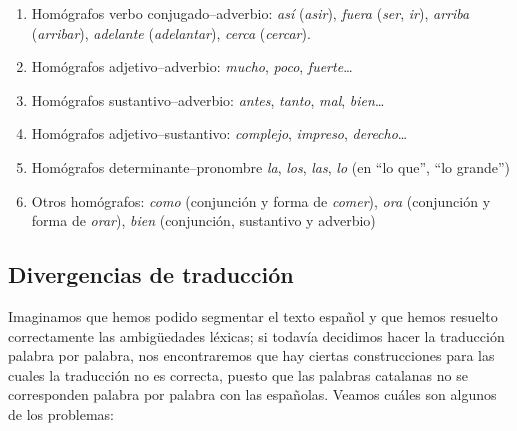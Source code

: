 {\begin{enumerate}
\item Homógrafos verbo conjugado--adverbio: \emph{así} (\emph{asir}), \emph{fuera} (\emph{ser}, \emph{ir}), \emph{ arriba} (\emph{arribar}), {\em adelante} (\emph{adelantar}), \emph{cerca} (\emph{cercar}). 

\item Homógrafos adjetivo--adverbio: \emph{mucho}, \emph{poco}, {\em fuerte}\ldots 

\item Homógrafos sustantivo--adverbio: \emph{antes}, \emph{tanto}, \emph{mal}, \emph{bien}\ldots 

\item Homógrafos adjetivo--sustantivo: \emph{complejo}, {\em impreso}, \emph{derecho}\ldots  

\item Homógrafos determinante--pronombre \emph{la}, \emph{los}, \emph{las}, \emph{lo} (en ``lo que'', ``lo grande'') 

\item Otros homógrafos: \emph{como} (conjunción y forma de \emph{comer}), \emph{ora} (conjunción y forma de \emph{orar}), \emph{bien} (conjunción, sustantivo y adverbio) 

\end{enumerate} 

\subsection{Divergencias de traducción} 

Imaginamos que hemos podido segmentar el texto español y que hemos resuelto correctamente las ambigüedades léxicas; si todavía decidimos hacer la traducción palabra por palabra, nos encontraremos que hay ciertas construcciones para las cuales la traducción no es correcta, puesto que las palabras catalanas no se corresponden palabra por palabra con las españolas. Veamos cuáles son algunos de los problemas: 

}
